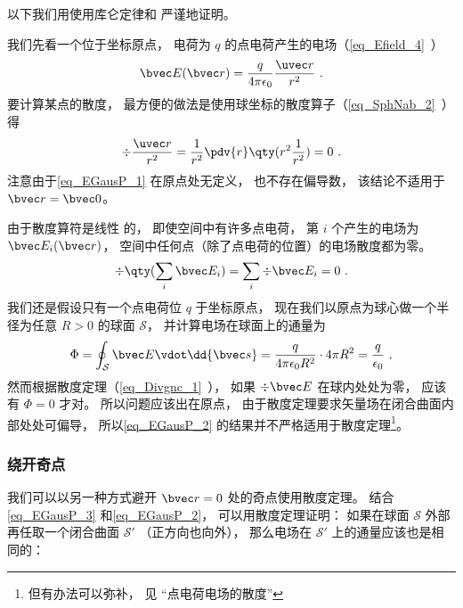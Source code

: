 

以下我们用使用库仑定律和 严谨地证明。

我们先看一个位于坐标原点， 电荷为 $q$ 的点电荷产生的电场（\autoref{eq_Efield_4}~）
\begin{equation}\label{eq_EGausP_1}
\bvec E(\bvec r) = \frac{q}{4\pi\epsilon_0}\frac{\uvec r}{r^2}~.
\end{equation}
要计算某点的散度， 最方便的做法是使用球坐标的散度算子（\autoref{eq_SphNab_2}~）得
\begin{equation}
\div \frac{\uvec r}{r^2} = \frac{1}{r^2} \pdv{r} \qty(r^2 \frac{1}{r^2}) = 0~.
\end{equation}
注意由于\autoref{eq_EGausP_1} 在原点处无定义， 也不存在偏导数， 该结论不适用于 $\bvec r = \bvec 0$。

由于散度算符是线性%
的， 即使空间中有许多点电荷， 第 $i$ 个产生的电场为 $\bvec E_i(\bvec r)$， 空间中任何点（除了点电荷的位置）的电场散度都为零。
\begin{equation}\label{eq_EGausP_3}
\div \qty(\sum_i \bvec E_i) = \sum_i \div \bvec E_i = 0~.
\end{equation}
我们还是假设只有一个点电荷位 $q$ 于坐标原点， 现在我们以原点为球心做一个半径为任意 $R > 0$ 的球面 $\mathcal S$， 并计算电场在球面上的通量为
\begin{equation}\label{eq_EGausP_2}
\Phi = \oint_{\mathcal S} \bvec E \vdot \dd{\bvec s} = \frac{q}{4\pi\epsilon_0 R^2} \cdot 4\pi R^2 = \frac{q}{\epsilon_0}~.
\end{equation}
然而根据散度定理（\autoref{eq_Divgnc_1}~）， 如果 $\div \bvec E$ 在球内处处为零， 应该有 $\Phi = 0$ 才对。 所以问题应该出在原点， 由于散度定理要求矢量场在闭合曲面内部处处可偏导， %
 所以\autoref{eq_EGausP_2} 的结果并不严格适用于散度定理\footnote{但有办法可以弥补， 见 “点电荷电场的散度”}。 %

\subsubsection{绕开奇点}
我们可以以另一种方式避开 $\bvec r = 0$ 处的奇点使用散度定理。 结合\autoref{eq_EGausP_3} 和\autoref{eq_EGausP_2}， 可以用散度定理证明： 如果在球面 $\mathcal S$ 外部再任取一个闭合曲面 $\mathcal S'$ （正方向也向外）， 那么电场在 $\mathcal S'$ 上的通量应该也是相同的：

